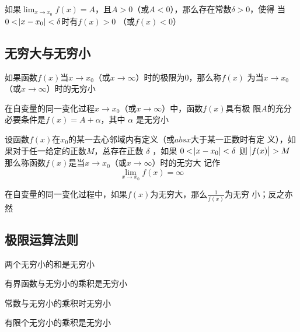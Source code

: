 \documentclass[11pt]{article}
\begin{document}
\begin{theorem}[函数极限的局部保号性]
如果\(\lim_{x\to x_0}f(x)=A\)，且\(A>0\)（或\(A<0\)），那么存在常数\(\delta>0\)，使得
当\(0<\abs{x-x_0}<\delta\)时有\(f(x)>0\) （或\(f(x)<0\)）
\end{theorem}
\subsection{无穷大与无穷小}
\label{sec:org9cc2d8d}
\begin{definition}[]
如果函数\(f(x)\)当\(x\to x_0\)（或\(x\to\infty\)）时的极限为0，那么称\(f(x)\)
为当\(x\to x_0\)（或\(x\to\infty\)）时的无穷小
\end{definition}

\begin{theorem}[]
在自变量的同一变化过程\(x\to x_0\)（或\(x\to\infty\)）中，函数\(f(x)\)具有极
限\(A\)的充分必要条件是\(f(x)=A+\alpha\)，其中 \(\alpha\) 是无穷小
\end{theorem}

\begin{definition}[]
设函数\(f(x)\)在\(x_0\)的某一去心邻域内有定义（或\(abs{x}\)大于某一正数时有定
义），如果对于任一给定的正数\(M\)，总存在正数 \(\delta\) ，如果
\(0<\abs{x-x_0}<\delta\) 则
\(\abs{f(x)}>M\)
那么称函数\(f(x)\)是当\(x\to x_0\)（或\(x\to\infty\)）时的无穷大
记作
\begin{equation*}
\lim_{x\to x_0}f(x)=\infty
\end{equation*}
\end{definition}

\begin{theorem}[]
在自变量的同一变化过程中，如果\(f(x)\)为无穷大，那么\(\frac{1}{f(x)}\)为无穷
小；反之亦然
\end{theorem}
\subsection{极限运算法则}
\label{sec:orgbb0c199}
\begin{theorem}[]
两个无穷小的和是无穷小
\end{theorem}

\begin{theorem}[]
有界函数与无穷小的乘积是无穷小
\end{theorem}

\begin{corollary}[]
常数与无穷小的乘积时无穷小
\end{corollary}

\begin{corollary}[]
有限个无穷小的乘积是无穷小
\end{corollary}
\end{document}
